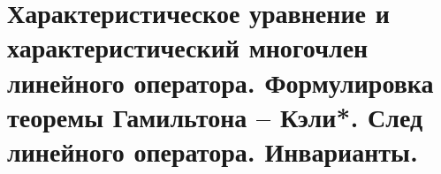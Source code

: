 \section{
    Характеристическое уравнение и характеристический многочлен линейного оператора. Формулировка теоремы Гамильтона – Кэли*. След линейного оператора. Инварианты.
}
